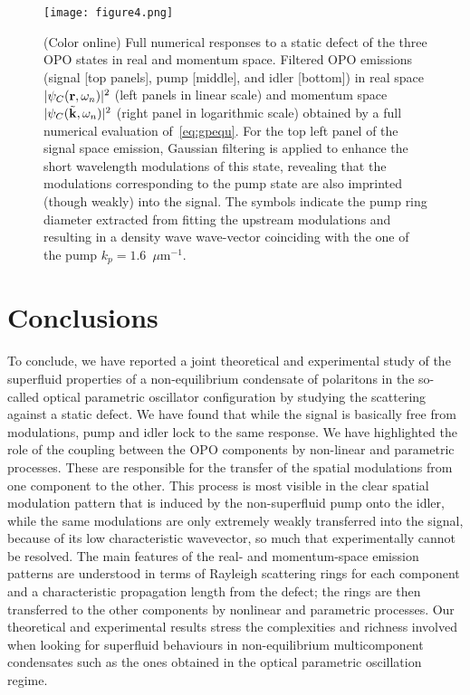 %
\begin{figure}[h!]
\centering
\texttt{[image: figure4.png]}
\caption{(Color online) Full numerical responses to a static defect of
  the three OPO states in real and momentum space. Filtered OPO
  emissions (signal [top panels], pump [middle], and idler [bottom])
  in real space $|\psi_C ({\mathbf r},\omega_n)|^2$ (left panels in
  linear scale) and momentum space $|\psi_C
  (\tilde{{\mathbf k}},\omega_n)|^2$ (right panel in logarithmic scale)
  obtained by a full numerical evaluation of~\eqref{eq:gpequ}. For the
  top left panel of the signal space emission, Gaussian filtering is
  applied to enhance the short wavelength modulations of this state,
  revealing that the modulations corresponding to the pump state are
  also imprinted (though weakly) into the signal. The symbols indicate
  the pump ring diameter extracted from fitting the upstream
  modulations and resulting in a density wave wave-vector coinciding
  with the one of the pump $k_p=1.6$~$\mu$m$^{-1}$.}
\label{fig:numer}
\end{figure}
%
\section{Conclusions}
%
To conclude, we have reported a joint theoretical and experimental
study of the superfluid properties of a non-equilibrium condensate of
polaritons in the so-called optical parametric oscillator
configuration by studying the scattering against a static defect.
%
We have found that while the signal is basically free from
modulations, pump and idler lock to the same response. We have
highlighted the role of the coupling between the OPO components by
non-linear and parametric processes. These are responsible for the
transfer of the spatial modulations from one component to the
other. This process is most visible in the clear spatial modulation
pattern that is induced by the non-superfluid pump onto the idler,
while the same modulations are only extremely weakly transferred into
the signal, because of its low characteristic wavevector, so much that
experimentally cannot be resolved.
%
The main features of the real- and momentum-space emission patterns
are understood in terms of Rayleigh scattering rings for each
component and a characteristic propagation length from the defect; the
rings are then transferred to the other components by nonlinear and
parametric processes.
Our theoretical and experimental results stress the complexities and
richness involved when looking for superfluid behaviours in
non-equilibrium multicomponent condensates such as the ones obtained
in the optical parametric oscillation regime.


